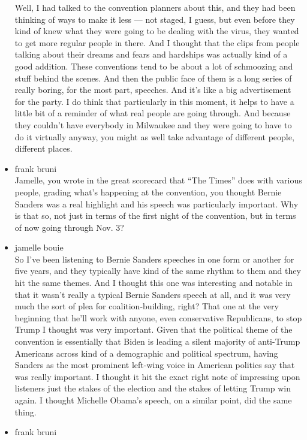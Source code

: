 \begin{itemize}
  Well, I had talked to the convention planners about this, and they had
  been thinking of ways to make it less --- not staged, I guess, but
  even before they kind of knew what they were going to be dealing with
  the virus, they wanted to get more regular people in there. And I
  thought that the clips from people talking about their dreams and
  fears and hardships was actually kind of a good addition. These
  conventions tend to be about a lot of schmoozing and stuff behind the
  scenes. And then the public face of them is a long series of really
  boring, for the most part, speeches. And it's like a big advertisement
  for the party. I do think that particularly in this moment, it helps
  to have a little bit of a reminder of what real people are going
  through. And because they couldn't have everybody in Milwaukee and
  they were going to have to do it virtually anyway, you might as well
  take advantage of different people, different places.
\item
  frank bruni\\
  Jamelle, you wrote in the great scorecard that ``The Times'' does with
  various people, grading what's happening at the convention, you
  thought Bernie Sanders was a real highlight and his speech was
  particularly important. Why is that so, not just in terms of the first
  night of the convention, but in terms of now going through Nov. 3?
\item
  jamelle bouie\\
  So I've been listening to Bernie Sanders speeches in one form or
  another for five years, and they typically have kind of the same
  rhythm to them and they hit the same themes. And I thought this one
  was interesting and notable in that it wasn't really a typical Bernie
  Sanders speech at all, and it was very much the sort of plea for
  coalition-building, right? That one at the very beginning that he'll
  work with anyone, even conservative Republicans, to stop Trump I
  thought was very important. Given that the political theme of the
  convention is essentially that Biden is leading a silent majority of
  anti-Trump Americans across kind of a demographic and political
  spectrum, having Sanders as the most prominent left-wing voice in
  American politics say that was really important. I thought it hit the
  exact right note of impressing upon listeners just the stakes of the
  election and the stakes of letting Trump win again. I thought Michelle
  Obama's speech, on a similar point, did the same thing.
\item
  frank bruni\\

\end{itemize}
